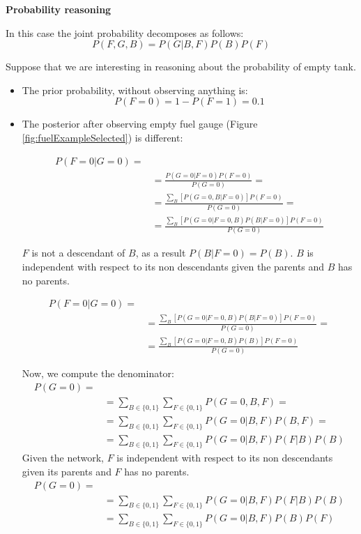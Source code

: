 \textbf{Probability reasoning}
\newline

In this case the joint probability decomposes as follows:
\[
	P(F,G,B) = P(G | B,F)P(B)P(F)
\]

Suppose that we are interesting in reasoning about the probability of empty tank.
\begin{itemize}
	\item The prior probability, without observing anything is:
		\[
			P(F=0) = 1 - P(F=1) = 0.1
		\]

	\item The posterior after observing empty fuel gauge (Figure
		\ref{fig:fuelExampleSelected}) is different:

		\begin{align*}
			P(F=0 | G=0) = \\
			              & =\frac{P(G=0 | F=0) P(F=0)}{P(G=0)}=                      \\
			              & =\frac{\sum_{B}[P(G=0,B | F=0)] P(F=0)}{P(G=0)}=          \\
			              & =\frac{\sum_{B}[P(G=0 | F=0, B) P(B|F=0)] P(F=0)}{P(G=0)}
		\end{align*}

		$F$ is not a descendant of $B$, as a result $P(B|F=0) = P(B)$. $B$ is
		independent with respect to its non descendants given the parents and $B$
		has no parents.

		\begin{align*}
			P(F=0 | G=0) = \\
			              & =\frac{\sum_{B}[P(G=0 | F=0, B) P(B|F=0)] P(F=0)}{P(G=0)}= \\
			              & =\frac{\sum_{B}[P(G=0 | F=0, B) P(B)] P(F=0)}{P(G=0)}
		\end{align*}

		Now, we compute the denominator:
		\begin{align*}
			P(G=0) = \\
			        & =\sum_{B \in \{0,1\}}\sum_{F \in \{0,1\}}P(G=0, B, F) =             \\
			        & = \sum_{B \in \{0,1\}}\sum_{F \in \{0,1\}}P(G=0 | B, F)P(B,F) =     \\
			        & = \sum_{B \in \{0,1\}}\sum_{F \in \{0,1\}}P(G=0 | B, F) P(F|B) P(B)
		\end{align*}
		Given the network, $F$ is independent with respect to its non descendants
		given its parents and $F$ has no parents.
		\begin{align*}
			P(G=0) = \\
			        & = \sum_{B \in \{0,1\}}\sum_{F \in \{0,1\}}P(G=0 | B, F) P(F|B) P(B) \\
			        & =\sum_{B \in \{0,1\}}\sum_{F \in \{0,1\}}P(G=0 | B, F)P(B)P(F)
		\end{align*}


\end{itemize}
